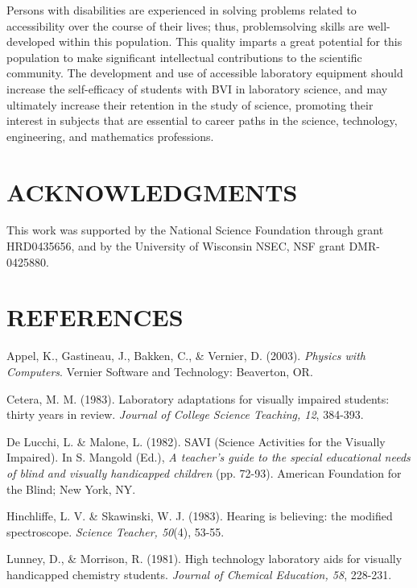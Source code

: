 \documentclass[11.5pt]{sig-alternate} %
\begin{document}
\begin{large}
Persons with disabilities are experienced in solving problems related to accessibility over the course of their lives; thus, problemsolving skills are well-developed within this population. This quality imparts a great potential for this population to make significant intellectual contributions to the scientific community. The development and use of accessible laboratory equipment should increase the self-efficacy of students with BVI in laboratory science, and may ultimately increase their retention in the study of science, promoting their interest in subjects that are essential to career paths in the science, technology, engineering, and mathematics professions.   
 
\section*{ACKNOWLEDGMENTS }
 
This work was supported by the National Science Foundation through grant HRD0435656, and by the University of Wisconsin NSEC, NSF grant DMR-0425880. 

\end{large}
 
\section*{REFERENCES}\par 

\leftskip 0.25in
\parindent -0.25in 
Appel, K., Gastineau, J., Bakken, C., \& Vernier, D. (2003). \textit{Physics with Computers}. Vernier Software and Technology: Beaverton, OR. 
 
Cetera, M. M. (1983). Laboratory adaptations for visually impaired students: thirty years in review. \textit{Journal of College Science Teaching, 12}, 384-393. 
 
De Lucchi, L. \& Malone, L. (1982). SAVI (Science Activities for the Visually Impaired).  In S. Mangold (Ed.), \textit{A teacher’s guide to the special educational needs of blind and visually handicapped children} (pp. 72-93). American Foundation for the Blind; New York, NY. 

Hinchliffe, L. V. \& Skawinski, W. J. (1983). Hearing is believing: the modified spectroscope. \textit{Science Teacher, 50}(4), 53-55. 
 
Lunney, D., \& Morrison, R. (1981). High technology laboratory aids for visually handicapped chemistry students. \textit{Journal of Chemical Education, 58}, 228-231. 
 
\end{document}
